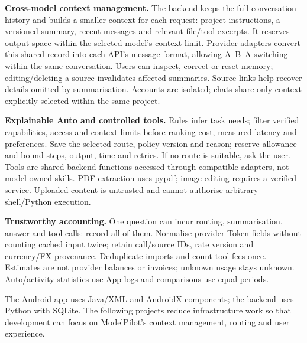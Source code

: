 \documentclass[10pt,a4paper]{article}
\newcommand{\sect}[2]{\par\vspace{6pt}{\sffamily\bfseries\fontsize{12.5}{15}\selectfont\color{ink}#1\enspace #2}\par\vspace{2pt}}
\newcommand{\sub}[1]{\par\vspace{3pt}\textbf{\color{ink}#1}\enspace}
\begin{document}
\sub{Cross-model context management.}
The backend keeps the full conversation history and builds a smaller context for each request: project instructions, a versioned summary, recent messages and relevant file/tool excerpts. It reserves output space within the selected model's context limit. Provider adapters convert this shared record into each API's message format, allowing A--B--A switching within the same conversation. Users can inspect, correct or reset memory; editing/deleting a source invalidates affected summaries. Source links help recover details omitted by summarisation. Accounts are isolated; chats share only context explicitly selected within the same project.

\sub{Explainable Auto and controlled tools.}
Rules infer task needs; filter verified capabilities, access and context limits before ranking cost, measured latency and preferences. Save the selected route, policy version and reason; reserve allowance and bound steps, output, time and retries. If no route is suitable, ask the user. Tools are shared backend functions accessed through compatible adapters, not model-owned skills. PDF extraction uses \href{https://github.com/py-pdf/pypdf}{pypdf}; image editing requires a verified service. Uploaded content is untrusted and cannot authorise arbitrary shell/Python execution.

\sub{Trustworthy accounting.}
One question can incur routing, summarisation, answer and tool calls: record all of them. Normalise provider Token fields without counting cached input twice; retain call/source IDs, rate version and currency/FX provenance. Deduplicate imports and count tool fees once. Estimates are not provider balances or invoices; unknown usage stays unknown. Auto/activity statistics use App logs and comparisons use equal periods.

\sect{7}{Open-source projects, tools and APIs}
The Android app uses Java/XML and AndroidX components; the backend uses Python with SQLite. The following projects reduce infrastructure work so that development can focus on ModelPilot's context management, routing and user experience.
\end{document}
